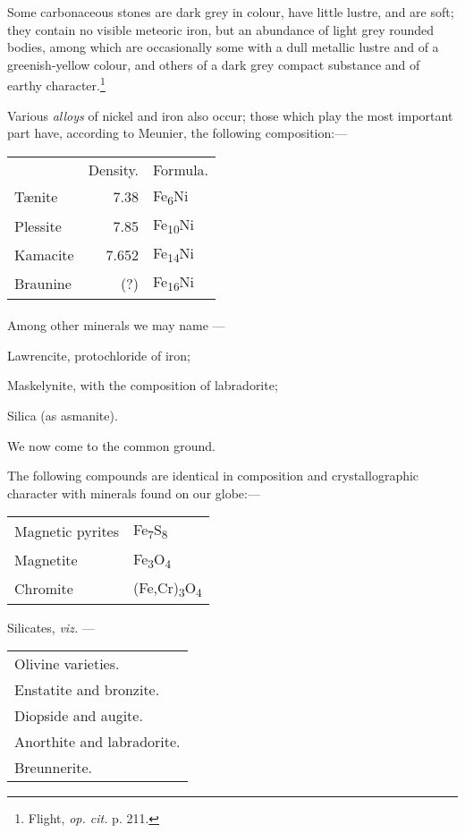 \documentclass[a4paper, 12pt, oneside, polutonikogreek, english]{article}
\begin{document}
Some carbonaceous stones are dark grey in colour, have little lustre, and are soft; they contain no visible meteoric iron, but an abundance of light grey rounded bodies, among which are occasionally some with a dull metallic lustre and of a greenish-yellow colour, and others of a dark grey compact substance and of earthy character.\footnote{Flight, \emph{op. cit.} p. 211.}

Various \emph{alloys} of nickel and iron also occur; those which play the most important part have, according to Meunier, the following composition:---
\begin{table}[H]
    \centering
    \begin{tabular}{l r l}
        ~ & Density. & Formula. \\ 
        Tænite & 7.38 & Fe\textsubscript{6}Ni \\ 
        Plessite & 7.85 & Fe\textsubscript{10}Ni \\ 
        Kamacite & 7.652 & Fe\textsubscript{14}Ni \\ 
        Braunine & (?) & Fe\textsubscript{16}Ni \\ 
    \end{tabular}
\end{table}
\paragraph{}
Among other minerals we may name ---

Lawrencite, protochloride of iron;

Maskelynite, with the composition of labradorite;

Silica (as asmanite).

We now come to the common ground.

The following compounds are identical in composition and crystallographic character with minerals found on our globe:---
\begin{table}[H]
    \centering
    \begin{tabular}{l l}
        Magnetic pyrites & Fe\textsubscript{7}S\textsubscript{8} \\ 
        Magnetite & Fe\textsubscript{3}O\textsubscript{4} \\ 
        Chromite & (Fe,Cr)\textsubscript{3}O\textsubscript{4} \\ 
    \end{tabular}
\end{table}
Silicates, \emph{viz.} --- 
\begin{table}[H]
    \centering
    \begin{tabular}{l}
        Olivine varieties.  \\ 
        Enstatite and bronzite.  \\ 
        Diopside and augite.  \\ 
        Anorthite and labradorite. \\
        Breunnerite. \\
    \end{tabular}
\end{table}
\end{document}
